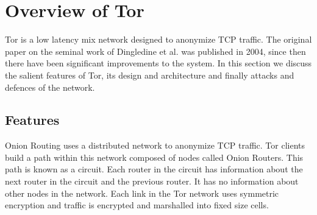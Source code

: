 \documentclass{llncs}
\begin{document}
\section{Overview of Tor} \label{tor}
Tor is a low latency mix network designed to anonymize TCP traffic. The original paper on the seminal work of Dingledine et al. \cite{tor-design} was published in 2004, since then there have been significant improvements to the system. In this section we discuss the salient features of Tor, its design and architecture and finally attacks and defences of the network. 
\subsection{Features}
Onion Routing uses a distributed network to anonymize TCP traffic. Tor clients build a path within this network composed of nodes called Onion Routers. This path is known as a circuit. Each router in the circuit has information about the next router in the circuit and the previous router. It has no information about other nodes in the network. Each link in the Tor network uses symmetric encryption and traffic is encrypted and marshalled into fixed size cells. 
\end{document}
